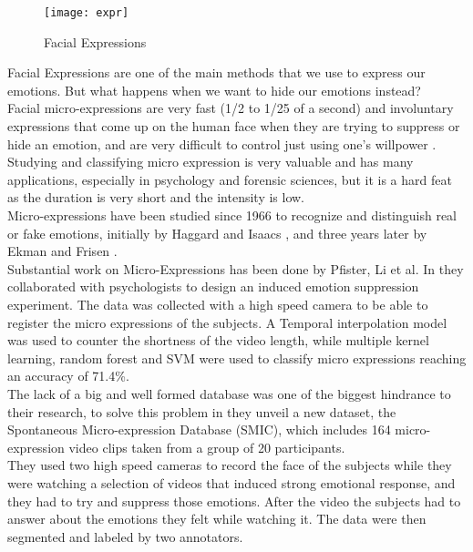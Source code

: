 \begin{figure}[H]
	\centering
	\texttt{[image: expr]}
	\caption{Facial Expressions}
\end{figure}

Facial Expressions are one of the main methods that we use to express our emotions. But what happens when we want to hide our emotions instead? \\
Facial micro-expressions are very fast (1/2 to 1/25 of a second) and involuntary expressions that come up on the human face when they are trying to suppress or hide an emotion, and are very difficult to control just using one's willpower \cite{EkmanER}. \\

Studying and classifying micro expression is very valuable and has many applications, especially in psychology and forensic sciences, but it is a hard feat as the duration is very short and the intensity is low.\\ 
Micro-expressions have been studied since 1966 to recognize and distinguish real or fake emotions, initially by Haggard and Isaacs \cite{Haggard}, and three years later by Ekman and Frisen \cite{EkmanLeakage}. \\

Substantial work on Micro-Expressions has been done by Pfister, Li et al. In \cite{pfister2011micro} they collaborated with psychologists to design an induced emotion suppression experiment. The data was collected with a high speed camera to be able to register the micro expressions of the subjects. A Temporal interpolation model was used to counter the shortness of the video length, while multiple kernel learning, random forest and SVM were used to classify micro expressions reaching an accuracy of 71.4\%. \\

The lack of a big and well formed database was one of the biggest hindrance to their research, to solve this problem in \cite{xli2012spontaneous} they unveil a new dataset, the Spontaneous Micro-expression Database (SMIC), which includes 164 micro-expression video clips taken from a group of 20 participants.\\
They used two high speed cameras to record the face of the subjects while they were watching a selection of videos that induced strong emotional response, and they had to try and suppress those emotions. After the video the subjects had to answer about the emotions they felt while watching it. The data were then segmented and labeled by two annotators. \\

